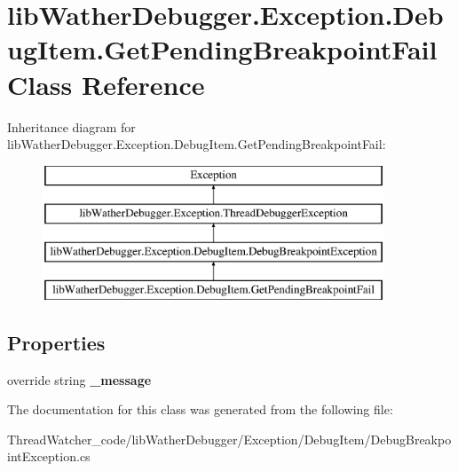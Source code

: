 \hypertarget{classlib_wather_debugger_1_1_exception_1_1_debug_item_1_1_get_pending_breakpoint_fail}{\section{lib\+Wather\+Debugger.\+Exception.\+Debug\+Item.\+Get\+Pending\+Breakpoint\+Fail Class Reference}
\label{classlib_wather_debugger_1_1_exception_1_1_debug_item_1_1_get_pending_breakpoint_fail}
}
Inheritance diagram for lib\+Wather\+Debugger.\+Exception.\+Debug\+Item.\+Get\+Pending\+Breakpoint\+Fail\+:\begin{figure}[H]
\begin{center}
\leavevmode
\includegraphics[height=4.000000cm]{classlib_wather_debugger_1_1_exception_1_1_debug_item_1_1_get_pending_breakpoint_fail}
\end{center}
\end{figure}
\subsection*{Properties}
\begin{DoxyCompactItemize}
\item 
\hypertarget{classlib_wather_debugger_1_1_exception_1_1_debug_item_1_1_get_pending_breakpoint_fail_a51afdf8f89868cb8c176f3d8461854b1}{override string {\bfseries \+\_\+message}}\label{classlib_wather_debugger_1_1_exception_1_1_debug_item_1_1_get_pending_breakpoint_fail_a51afdf8f89868cb8c176f3d8461854b1}

\end{DoxyCompactItemize}


The documentation for this class was generated from the following file\+:\begin{DoxyCompactItemize}
\item 
Thread\+Watcher\+\_\+code/lib\+Wather\+Debugger/\+Exception/\+Debug\+Item/Debug\+Breakpoint\+Exception.\+cs\end{DoxyCompactItemize}
